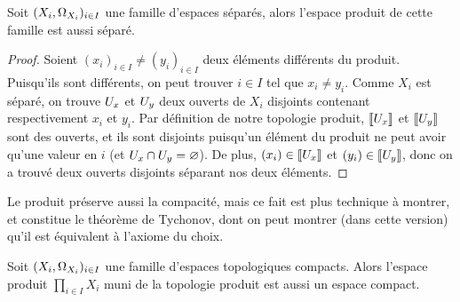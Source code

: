 \begin{proposition}
  Soit $(X_i,\Omega_{X_i})_{i\in I}$ une famille d'espaces séparés, alors l'espace
  produit de cette famille est aussi séparé.
\end{proposition}

\begin{proof}
  Soient $(x_i)_{i\in I}\neq (y_i)_{i\in I}$ deux éléments différents du produit.
  Puisqu'ils sont différents, on peut trouver $i\in I$ tel que $x_i \neq y_i$.
  Comme $X_i$ est séparé, on trouve $U_x$ et $U_y$ deux ouverts de
  $X_i$ disjoints contenant respectivement $x_i$ et $y_i$. Par définition de
  notre topologie produit, $\llbracket U_x\rrbracket$ et $\llbracket U_y\rrbracket$ sont des
  ouverts, et ils sont disjoints puisqu'un élément du produit ne peut avoir
  qu'une valeur en $i$ (et $U_x\cap U_y = \varnothing$). De plus,
  $(x_i)\in \llbracket U_x\rrbracket$ et $(y_i)\in\llbracket U_y\rrbracket$, donc on a trouvé
  deux ouverts disjoints séparant nos deux éléments.
\end{proof}

Le produit préserve aussi la compacité, mais ce fait est plus technique à
montrer, et constitue le théorème de Tychonov, dont on peut montrer (dans cette
version) qu'il est équivalent à l'axiome du choix.

\begin{theorem}\label{thm.tychonov}
  Soit $(X_i,\Omega_{X_i})_{i\in I}$ une famille d'espaces topologiques compacts.
  Alors l'espace produit $\displaystyle\prod_{i\in I} X_i$ muni de la topologie
  produit est aussi un espace compact.
\end{theorem}

